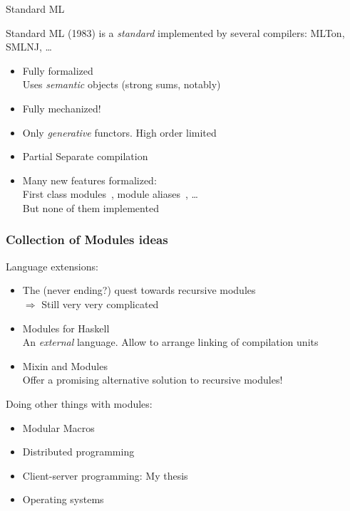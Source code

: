 \documentclass[aspectratio=169,dvipsnames,svgnames,10pt]{beamer}
\newcommand\Y{{\color{Green}{\ding{52}}}\xspace}
\newcommand\N{{\color{Red}{\ding{56}}}\xspace}
\newcommand\M{{\color{Orange}{\bf\textasciitilde}}\xspace}
\begin{document}
\begin{frame}{Standard ML}

  Standard ML (1983) is a \emph{standard} implemented by several compilers: MLTon, SMLNJ, \dots
  \begin{itemize}
  \item[\Y] Fully formalized \citep{MacQueen84}\\
    Uses \emph{semantic} objects (strong sums, notably)
  \item[\Y] Fully mechanized! \citep{Crary17,Crary19}
  \item[\N] Only \emph{generative} functors. High order limited
  \item[\M] Partial Separate compilation~\citep{DBLP:conf/ml/SwaseyVCH06}
  \item[\Y] Many new features formalized:\\
    First class modules~\citep{Russo00}, module aliases~\citep{Crary17}, \dots\\
    \N But none of them implemented
  \end{itemize}
  
\end{frame}

\begin{frame}
  \frametitle{Collection of Modules ideas}

  Language extensions:
  \begin{itemize}
  \item The (never ending?) quest towards recursive modules~\citep{dreyerthesis}\\
    $\Rightarrow$ Still very very complicated
  \item Modules for Haskell~\citep{backpack}\\
    An \emph{external} language. Allow to arrange linking of compilation units
  \item Mixin and Modules~\citep{DBLP:journals/toplas/RossbergD13}\\
    Offer a promising alternative solution to recursive modules!
  \end{itemize}
  \vfill
  \pause
  Doing other things with modules:
  \begin{itemize}
  \item Modular Macros~\citep{modularmacrosth}
  \item Distributed programming \citep{acute}
  \item Client-server programming: My thesis \smiley{} \citep{radannethesis}
  \item Operating systems~\citep{DBLP:conf/asplos/MadhavapeddyMRSSGSHC13,DBLP:journals/corr/abs-1905-02529}
  \end{itemize}
 
\end{frame}
\end{document}
